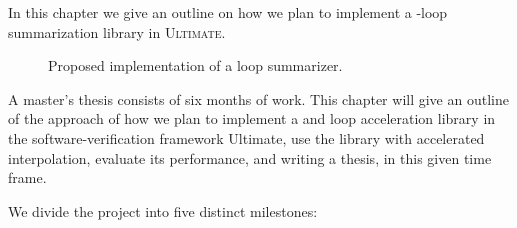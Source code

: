 
In this chapter we give an outline on how we plan to implement a \qvasrs-loop summarization library in \textsc{Ultimate}. \par
{}
\begin{figure}[H]
    \centering
    
    \caption{Proposed implementation of a \qvasrs loop summarizer.}
\end{figure}

A master's thesis consists of six months of work. This chapter will give an outline of the approach of how we plan to implement a \qvasr and \qvasrs loop acceleration library in the software-verification framework Ultimate, use the library with accelerated interpolation, evaluate its performance, and writing a thesis, in this given time frame. \\ \par
We divide the project into five distinct milestones:

